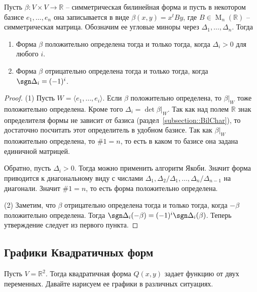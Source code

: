 \begin{claim}
\label{claim::SilvCrit}
Пусть $\beta\colon V\times V\to \mathbb R$ -- симметрическая билинейная форма и пусть в некотором базисе $e_1,\ldots,e_n$ она записывается в виде $\beta(x, y) = x^t B y$, где $B\in \operatorname{M}_n(\mathbb R)$ -- симметрическая матрица.
Обозначим ее угловые миноры через $\Delta_1,\ldots,\Delta_n$.
Тогда
\begin{enumerate}
\item Форма $\beta$ положительно определена тогда и только тогда, когда $\Delta_i > 0$ для любого $i$.

\item Форма $\beta$ отрицательно определена тогда и только тогда, когда $\sgn \Delta_i = (-1)^i$.
\end{enumerate}
\end{claim}
\begin{proof}
(1) Пусть $W = \langle e_1,\ldots,e_i\rangle$.
Если $\beta$ положительно определена, то $\beta|_W$ тоже положительно определена.
Кроме того $\Delta_i = \det \beta|_W$.
Так как над полем $\mathbb R$ знак определителя формы не зависит от базиса (раздел~\ref{subsection::BilChar}), то достаточно посчитать этот определитель в удобном базисе.
Так как $\beta|_W$ положительно определена, то $\#1 = n$, то есть в каком то базисе она задана единичной матрицей.

Обратно, пусть $\Delta_i > 0$.
Тогда можно применить алгоритм Якоби.
Значит форма приводится к диагональному виду с числами $\Delta_1, \Delta_2/\Delta_1,\ldots,\Delta_n/\Delta_{n-1}$ на диагонали.
Значит $\#1 = n$, то есть форма положительно определена.

(2) Заметим, что $\beta$ отрицательно определена тогда и только тогда, когда $-\beta$ положительно определена.
Тогда $\sgn\Delta_i(-\beta) = (-1)^i\sgn\Delta_i(\beta)$.
Теперь утверждение следует из первого пункта.
\end{proof}

\subsection{Графики Квадратичных форм}

Пусть $V = \mathbb R^2$.
Тогда квадратичная форма $Q(x, y)$ задает функцию от двух переменных.
Давайте нарисуем ее графики в различных ситуациях.

